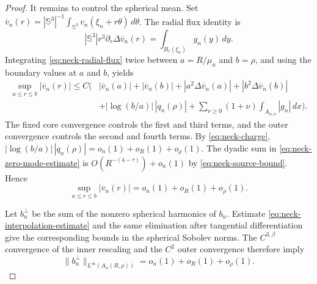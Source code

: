 \documentclass[11pt]{article}
\numberwithin{equation}{section}
\begin{document}
\begin{proof}
It remains to control the spherical mean.  Set
$\overline v_n(r)=|\mathbb S^3|^{-1}\int_{\mathbb S^3}
v_n(\xi_n+r\theta)\,d\theta$.  The radial flux identity is
\begin{equation}\label{eq:neck-radial-flux}
|\mathbb S^3|r^3\partial_r\Delta\overline v_n(r)
=\int_{B_r(\xi_n)}g_n(y)\,dy.
\end{equation}
Integrating \eqref{eq:neck-radial-flux} twice between
$a=R/\mu_n$ and $b=\rho$, and using the boundary values at $a$ and
$b$, yields
\begin{equation}\label{eq:neck-zero-mode-estimate}
\begin{aligned}
\sup_{a\leq r\leq b}|\overline v_n(r)|
\leq C\Big(&|\overline v_n(a)|+|\overline v_n(b)|
+|a^2\Delta\overline v_n(a)|
+|b^2\Delta\overline v_n(b)|\\
&+|\log(b/a)|\,|q_n(\rho)|
+\sum_{\nu\geq0}(1+\nu)
\int_{A_{n,\nu}}|g_n|\,dx\Big).
\end{aligned}
\end{equation}
The fixed core convergence controls the first and third terms, and
the outer convergence controls the second and fourth terms.  By
\eqref{eq:neck-charge},
$|\log(b/a)|\,|q_n(\rho)|
=o_n(1)+o_R(1)+o_\rho(1)$.  The dyadic sum in
\eqref{eq:neck-zero-mode-estimate} is
$O(R^{-(4-\tau)})+o_n(1)$ by
\eqref{eq:neck-source-bound}.  Hence
\begin{equation}\label{eq:neck-mean-small}
\sup_{a\leq r\leq b}|\overline v_n(r)|
=o_n(1)+o_R(1)+o_\rho(1).
\end{equation}

Let $b_n^\perp$ be the sum of the nonzero spherical harmonics of
$b_n$.  Estimate \eqref{eq:neck-interpolation-estimate} and the same
elimination after tangential differentiation give the corresponding
bounds in the spherical Sobolev norms.  The
$C^{3,\beta}$ convergence of the inner rescaling and the $C^2$
outer convergence therefore imply
\begin{equation}\label{eq:neck-homogeneous-small}
\|b_n^\perp\|_{L^\infty(A_n(R,\rho))}
=o_n(1)+o_R(1)+o_\rho(1).
\end{equation}


\end{proof}
\end{document}
